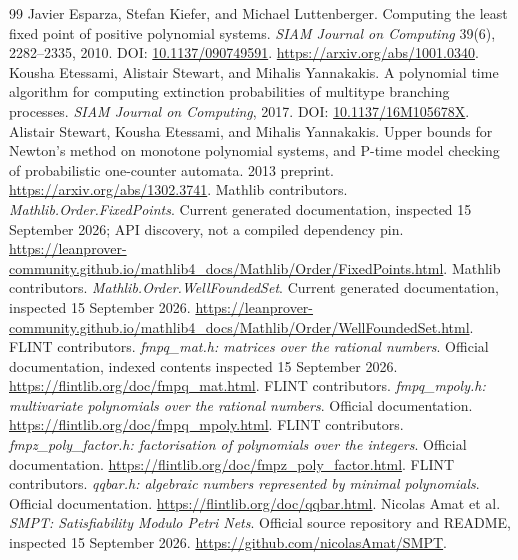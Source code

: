 \documentclass[11pt,a4paper]{article}
\theoremstyle{definition}\newtheorem{definition}[theorem]{Definition}
\theoremstyle{remark}\newtheorem{remark}[theorem]{Remark}
\begin{document}
\begin{thebibliography}{99}
 Javier Esparza, Stefan Kiefer, and Michael Luttenberger. Computing the least fixed point of positive polynomial systems. \emph{SIAM Journal on Computing} 39(6), 2282--2335, 2010. DOI: \href{https://doi.org/10.1137/090749591}{10.1137/090749591}. \url{https://arxiv.org/abs/1001.0340}.
 Kousha Etessami, Alistair Stewart, and Mihalis Yannakakis. A polynomial time algorithm for computing extinction probabilities of multitype branching processes. \emph{SIAM Journal on Computing}, 2017. DOI: \href{https://doi.org/10.1137/16M105678X}{10.1137/16M105678X}.
 Alistair Stewart, Kousha Etessami, and Mihalis Yannakakis. Upper bounds for Newton's method on monotone polynomial systems, and P-time model checking of probabilistic one-counter automata. 2013 preprint. \url{https://arxiv.org/abs/1302.3741}.
 Mathlib contributors. \emph{Mathlib.Order.FixedPoints}. Current generated documentation, inspected 15 September 2026; API discovery, not a compiled dependency pin. \url{https://leanprover-community.github.io/mathlib4_docs/Mathlib/Order/FixedPoints.html}.
 Mathlib contributors. \emph{Mathlib.Order.WellFoundedSet}. Current generated documentation, inspected 15 September 2026. \url{https://leanprover-community.github.io/mathlib4_docs/Mathlib/Order/WellFoundedSet.html}.
 FLINT contributors. \emph{fmpq\_mat.h: matrices over the rational numbers}. Official documentation, indexed contents inspected 15 September 2026. \url{https://flintlib.org/doc/fmpq_mat.html}.
 FLINT contributors. \emph{fmpq\_mpoly.h: multivariate polynomials over the rational numbers}. Official documentation. \url{https://flintlib.org/doc/fmpq_mpoly.html}.
 FLINT contributors. \emph{fmpz\_poly\_factor.h: factorisation of polynomials over the integers}. Official documentation. \url{https://flintlib.org/doc/fmpz_poly_factor.html}.
 FLINT contributors. \emph{qqbar.h: algebraic numbers represented by minimal polynomials}. Official documentation. \url{https://flintlib.org/doc/qqbar.html}.
 Nicolas Amat et al. \emph{SMPT: Satisfiability Modulo Petri Nets}. Official source repository and README, inspected 15 September 2026. \url{https://github.com/nicolasAmat/SMPT}.
\end{thebibliography}
\endgroup

\end{document}
